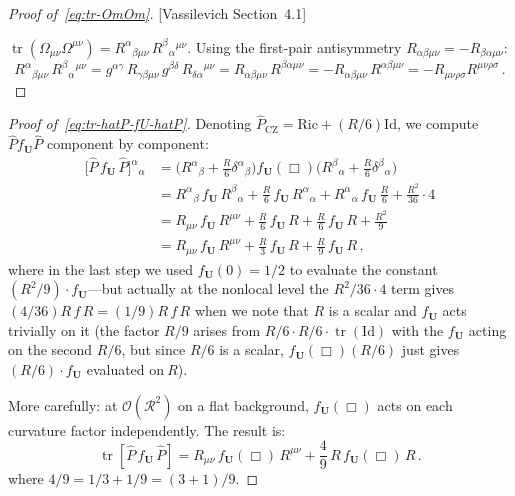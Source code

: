 \documentclass[12pt,a4paper]{article}
\theoremstyle{definition}
\theoremstyle{remark}
\newcommand{\tr}{\operatorname{tr}}
\newcommand{\Rsq}{R_{\mu\nu\rho\sigma}R^{\mu\nu\rho\sigma}}
\newcommand{\Id}{\mathrm{Id}}
\newcommand{\fromlit}[1]{\textcolor{blue!70!black}{\textsf{[#1]}}}
\begin{document}
\begin{proof}[Proof of~\eqref{eq:tr-OmOm}]
\fromlit{Vassilevich Section~4.1}

$\tr(\Omega_{\mu\nu}\Omega^{\mu\nu})
= R^\alpha{}_{\beta\mu\nu}\,R^\beta{}_\alpha{}^{\mu\nu}$.
Using the first-pair antisymmetry $R_{\alpha\beta\mu\nu}
= -R_{\beta\alpha\mu\nu}$:
\begin{equation*}
  R^\alpha{}_{\beta\mu\nu}\,R^\beta{}_\alpha{}^{\mu\nu}
  = g^{\alpha\gamma}\,R_{\gamma\beta\mu\nu}\,g^{\beta\delta}\,
    R_{\delta\alpha}{}^{\mu\nu}
  = R_{\alpha\beta\mu\nu}\,R^{\beta\alpha\mu\nu}
  = -R_{\alpha\beta\mu\nu}\,R^{\alpha\beta\mu\nu}
  = -\Rsq\,.
\end{equation*}
\end{proof}

\begin{proof}[Proof of~\eqref{eq:tr-hatP-fU-hatP}]
Denoting $\hat{P}_{\mathrm{CZ}} = \mathrm{Ric} + (R/6)\Id$, we
compute $\hat{P} f_{\mathbf{U}} \hat{P}$ component by component:
\begin{align*}
  \bigl[\hat{P}\,f_{\mathbf{U}}\,\hat{P}\bigr]^\alpha{}_\alpha
  &= \bigl(R^\alpha{}_\beta + \tfrac{R}{6}\delta^\alpha{}_\beta\bigr)
  f_{\mathbf{U}}(\Box)
  \bigl(R^\beta{}_\alpha + \tfrac{R}{6}\delta^\beta{}_\alpha\bigr)
  \\
  &= R^\alpha{}_\beta\,f_{\mathbf{U}}\,R^\beta{}_\alpha
  + \frac{R}{6}\,f_{\mathbf{U}}\,R^\alpha{}_\alpha
  + R^\alpha{}_\alpha\,f_{\mathbf{U}}\,\frac{R}{6}
  + \frac{R^2}{36}\cdot 4
  \\
  &= R_{\mu\nu}\,f_{\mathbf{U}}\,R^{\mu\nu}
  + \frac{R}{6}\,f_{\mathbf{U}}\,R
  + \frac{R}{6}\,f_{\mathbf{U}}\,R
  + \frac{R^2}{9}
  \\
  &= R_{\mu\nu}\,f_{\mathbf{U}}\,R^{\mu\nu}
  + \frac{R}{3}\,f_{\mathbf{U}}\,R
  + \frac{R}{9}\,f_{\mathbf{U}}\,R\,,
\end{align*}
where in the last step we used $f_{\mathbf{U}}(0) = 1/2$
to evaluate the constant $(R^2/9)\cdot f_{\mathbf{U}}$---but
actually at the nonlocal level the $R^2/36 \cdot 4$ term
gives $(4/36)R\,f\,R = (1/9)R\,f\,R$ when we note that $R$
is a scalar and $f_{\mathbf{U}}$ acts trivially on it
(the factor $R/9$ arises from $R/6 \cdot R/6 \cdot \tr(\Id)$
with the $f_{\mathbf{U}}$ acting on the second $R/6$,
but since $R/6$ is a scalar, $f_{\mathbf{U}}(\Box)(R/6)$
just gives $(R/6)\cdot f_{\mathbf{U}}$ evaluated on$~R$).

More carefully: at $\mathcal{O}(\mathcal{R}^2)$ on a flat background,
$f_{\mathbf{U}}(\Box)$ acts on each curvature factor independently.
The result is:
\begin{equation*}
  \tr[\hat{P}\,f_{\mathbf{U}}\,\hat{P}]
  = R_{\mu\nu}\,f_{\mathbf{U}}(\Box)\,R^{\mu\nu}
  + \frac{4}{9}\,R\,f_{\mathbf{U}}(\Box)\,R\,.
\end{equation*}
where $4/9 = 1/3 + 1/9 = (3+1)/9$.
\end{proof}
\end{document}

